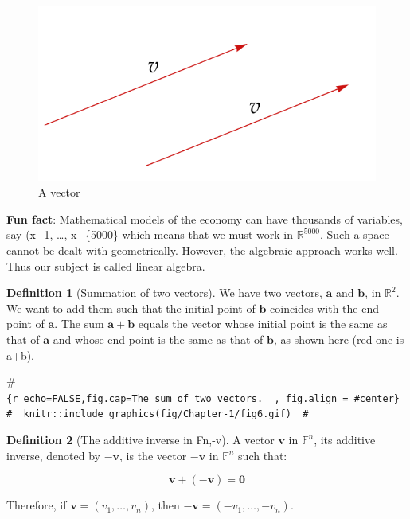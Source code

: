 \documentclass[
]{book}
\theoremstyle{definition}
\newtheorem{definition}{Definition}[chapter]
\theoremstyle{definition}
\theoremstyle{definition}
\theoremstyle{definition}
\theoremstyle{remark}
\begin{document}
\begin{figure}
\includegraphics[width=8.5in]{fig/Chapter-1/fig5} \caption{A vector}\label{fig:unnamed-chunk-21}
\end{figure}

\textbf{Fun fact}: Mathematical models of the economy
can have thousands of variables, say
(x\_1, \ldots, x\_\{5000\} which means that we must
work in \({\mathbb{R}}^{5000}\). Such a space cannot be
dealt with geometrically. However, the
algebraic approach works well. Thus
our subject is called linear algebra.

\begin{definition}[Summation of two vectors]
\protect\hypertarget{def:unnamed-chunk-22}{}\label{def:unnamed-chunk-22}We have two vectors, \(\mathbf{a}\) and \(\mathbf{b}\), in \(\mathbb{R}^2\). We want to add them such that the initial point of \(\mathbf{b}\) coincides with the end point of \(\mathbf{a}\). The sum \(\mathbf{a} + \mathbf{b}\) equals the vector whose initial point is the same as that of \(\mathbf{a}\) and whose end point is the same as that of \(\mathbf{b}\), as shown here (red one is a+b).
\end{definition}

\#\texttt{\{r\ echo=FALSE,fig.cap=\textquotesingle{}The\ sum\ of\ two\ vectors.\ \textquotesingle{}\ ,\ fig.align\ =\ \#\textquotesingle{}center\textquotesingle{}\}\ \#\ \ knitr::include\_graphics(\textquotesingle{}fig/Chapter-1/fig6.gif\textquotesingle{})\ \ \#}

\begin{definition}[The additive inverse in Fn,-v]
\protect\hypertarget{def:unnamed-chunk-23}{}\label{def:unnamed-chunk-23}A vector \(\mathbf{v}\) in \(\mathbb{F}^n\), its additive inverse, denoted by \(-\mathbf{v}\), is the vector \(-\mathbf{v}\) in \(\mathbb{F}^n\) such that:

\[ \mathbf{v} + (-\mathbf{v}) = \mathbf{0} \]

Therefore, if \(\mathbf{v} = (v_1, \ldots, v_n)\), then \(-\mathbf{v} = (-v_1, \ldots, -v_n)\).
\end{definition}
\end{document}
